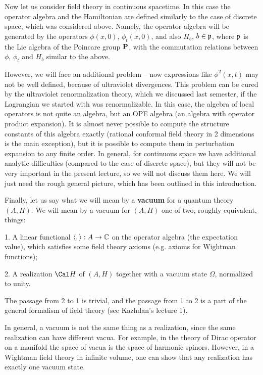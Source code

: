 Now let us consider field theory in continuous spacetime. 
In this case the operator algebra and the Hamiltonian are 
defined similarly to the case of discrete space, which was considered above. 
Namely, the operator algebra will be generated by the 
operators $\phi(x,0)$, $\phi_t(x,0)$, and also $H_b$, $b\in{\frak p}$, 
where ${\frak p}$ is the Lie algebra of the Poincare group $\bold P$, with the
commutation relations between $\phi$, $\phi_t$ and $H_b$ similar to the above. 

However, we will face an additional problem -- now expressions like
$\phi^2(x,t)$ may not be well defined, because of ultraviolet divergences. 
This problem can be cured by the ultraviolet renormalization theory,
which we discussed last semester, if the Lagrangian we started with
was renormalizable. In this case, the algebra of local operators
is not quite an algebra, but an OPE algebra (an algebra with operator 
product expansion). It is almost never possible to compute 
the structure constants of this algebra exactly
(rational conformal field theory in 2 dimensions is the main exception), 
but it is possible 
to compute them in perturbation expansion to any finite order. 
In general, for continuous space we have additional analytic
difficulties (compared to the case of discrete space), but they will not be very
important in the present lecture, so we will not discuss them here.  
We will just need the rough general picture, which has been outlined in this 
introduction. 

Finally, let us say what we will mean by a {\bf vacuum} for a quantum
theory $(A,H)$. We will mean by a vacuum for $(A,H)$ one of two,
roughly equivalent, things:

1. A linear functional $\langle,\rangle:A\to \Bbb C$ on the operator algebra
(the expectation value), which 
satisfies some field theory axioms (e.g. axioms for Wightman functions);
 
2. A realization $\Cal H$ of $(A,H)$ together with a vacuum state $\Omega$, 
normalized to unity. 

The passage from 2 to 1 is trivial, and the passage from 1 to 2 is a part of 
the general formalism of field theory (see Kazhdan's lecture 1).

In general, a vacuum is not the same thing as a realization, since 
the same realization can have different vacua. For example, 
in the theory of Dirac operator on a manifold the space of vacua 
is the space of harmonic spinors. However, in a Wightman field theory 
in infinite volume, 
one can show that any realization has exactly one vacuum state.  

